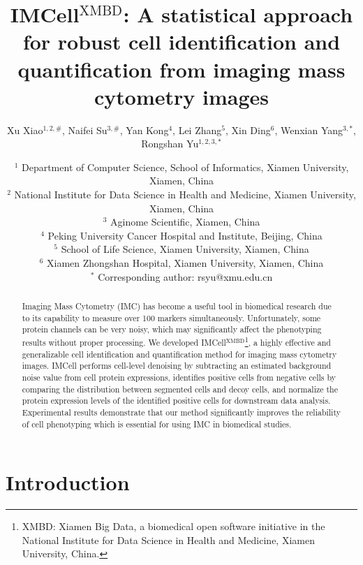 \documentclass{mynature}
\title{IMCell$^\textrm{XMBD}$: A statistical approach for robust cell identification and quantification from imaging mass cytometry images}
\author{Xu Xiao$^{1,2,\#}$, Naifei Su$^{3,\#}$, Yan Kong$^{4}$, Lei Zhang$^{5}$, Xin Ding$^{6}$, Wenxian Yang$^{3,*}$, Rongshan Yu$^{1,2,3,*}$}
\begin{document}
\maketitle

\date{\small{ \noindent
$^1$ Department of Computer Science, School of Informatics, Xiamen University, Xiamen, China \\
$^2$ National Institute for Data Science in Health and Medicine, Xiamen University, Xiamen, China \\
$^3$ Aginome Scientific, Xiamen, China \\
$^4$ Peking University Cancer Hospital and Institute, Beijing, China \\
$^5$ School of Life Science, Xiamen University, Xiamen, China \\ 
$^6$ Xiamen Zhongshan Hospital, Xiamen University, Xiamen, China \\   
$^{*}$ Corresponding author: rsyu@xmu.edu.cn \\
}}


\begin{abstract}
Imaging Mass Cytometry (IMC) has become a useful tool in biomedical research due to its capability to measure over 100 markers simultaneously. Unfortunately, some protein channels can be very noisy, which may significantly affect the phenotyping results without proper processing. We developed IMCell$^\textrm{XMBD}$\footnote{XMBD: Xiamen Big Data, a biomedical open software initiative in the National Institute for Data Science in Health and Medicine, Xiamen University, China.}, a highly effective and generalizable cell identification and quantification method for imaging mass cytometry images. 
IMCell performs cell-level denoising by subtracting an estimated background noise value from cell protein expressions, identifies positive cells from negative cells by comparing the distribution between segmented cells and decoy cells, and normalize the protein expression levels of the identified positive cells for downstream data analysis. 
Experimental results demonstrate that our method significantly improves the reliability of cell phenotyping which is essential for using IMC in biomedical studies.
\end{abstract}

\section{Introduction}
\end{document}
